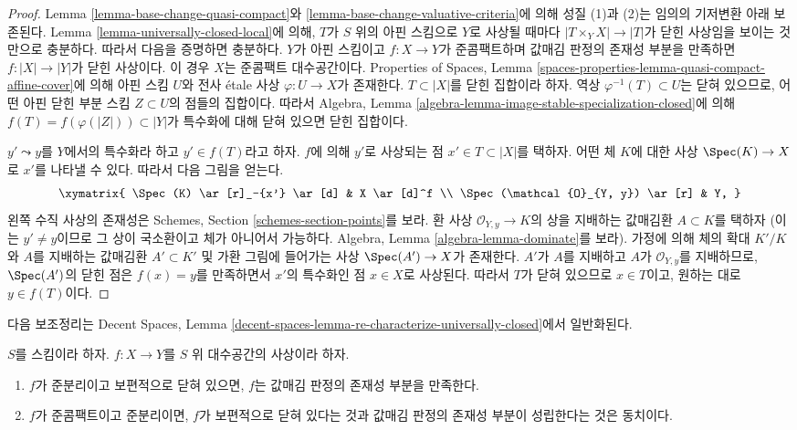 \begin{proof}
Lemma \ref{lemma-base-change-quasi-compact}와
\ref{lemma-base-change-valuative-criteria}에 의해 성질 (1)과 (2)는
임의의 기저변환 아래 보존된다. Lemma
\ref{lemma-universally-closed-local}에 의해, $T$가 $S$ 위의 아핀 스킴으로
$Y$로 사상될 때마다 $|T \times_Y X| \to |T|$가 닫힌 사상임을 보이는
것만으로 충분하다. 따라서 다음을 증명하면 충분하다. $Y$가 아핀 스킴이고
$f : X \to Y$가 준콤팩트하며 값매김 판정의 존재성 부분을 만족하면
$f : |X| \to |Y|$가 닫힌 사상이다. 이 경우 $X$는 준콤팩트 대수공간이다.
Properties of Spaces, Lemma
\ref{spaces-properties-lemma-quasi-compact-affine-cover}에 의해 아핀
스킴 $U$와 전사 \'etale 사상 $\varphi : U \to X$가 존재한다. $T \subset |X|$를
닫힌 집합이라 하자. 역상 $\varphi^{-1}(T) \subset U$는 닫혀 있으므로,
어떤 아핀 닫힌 부분 스킴 $Z \subset U$의 점들의 집합이다. 따라서
Algebra, Lemma
\ref{algebra-lemma-image-stable-specialization-closed}에 의해
$f(T) = f(\varphi(|Z|)) \subset |Y|$가 특수화에 대해 닫혀 있으면
닫힌 집합이다.

\medskip\noindent
$y' \leadsto y$를 $Y$에서의 특수화라 하고 $y' \in f(T)$라고 하자.
$f$에 의해 $y'$로 사상되는 점 $x' \in T \subset |X|$를 택하자.
어떤 체 $K$에 대한 사상 $\Spec(K) \to X$로 $x'$를 나타낼 수 있다.
따라서 다음 그림을 얻는다.
$$
\xymatrix{
\Spec(K) \ar[r]_-{x'} \ar[d] & X \ar[d]^f \\
\Spec(\mathcal{O}_{Y, y}) \ar[r] & Y,
}
$$
왼쪽 수직 사상의 존재성은
Schemes, Section \ref{schemes-section-points}를 보라.
환 사상 $\mathcal{O}_{Y, y} \to K$의 상을 지배하는 값매김환
$A \subset K$를 택하자 (이는 $y' \not = y$이므로 그 상이 국소환이고
체가 아니어서 가능하다. Algebra, Lemma
\ref{algebra-lemma-dominate}를 보라). 가정에 의해 체의 확대 $K'/K$와
$A$를 지배하는 값매김환 $A' \subset K'$ 및 가환 그림에 들어가는 사상
$\Spec(A') \to X$가 존재한다. $A'$가 $A$를 지배하고 $A$가
$\mathcal{O}_{Y, y}$를 지배하므로, $\Spec(A')$의 닫힌 점은
$f(x) = y$를 만족하면서 $x'$의 특수화인 점 $x \in X$로 사상된다.
따라서 $T$가 닫혀 있으므로 $x \in T$이고, 원하는 대로 $y \in f(T)$이다.
\end{proof}

\noindent
다음 보조정리는 Decent Spaces, Lemma
\ref{decent-spaces-lemma-re-characterize-universally-closed}에서
일반화된다.

\begin{lemma}
\label{lemma-characterize-universally-closed-quasi-separated}
$S$를 스킴이라 하자. $f : X \to Y$를
$S$ 위 대수공간의 사상이라 하자.
\begin{enumerate}
\item $f$가 준분리이고 보편적으로 닫혀 있으면, $f$는 값매김 판정의
존재성 부분을 만족한다.
\item $f$가 준콤팩트이고 준분리이면, $f$가 보편적으로 닫혀 있다는 것과
값매김 판정의 존재성 부분이 성립한다는 것은 동치이다.
\end{enumerate}
\end{lemma}

